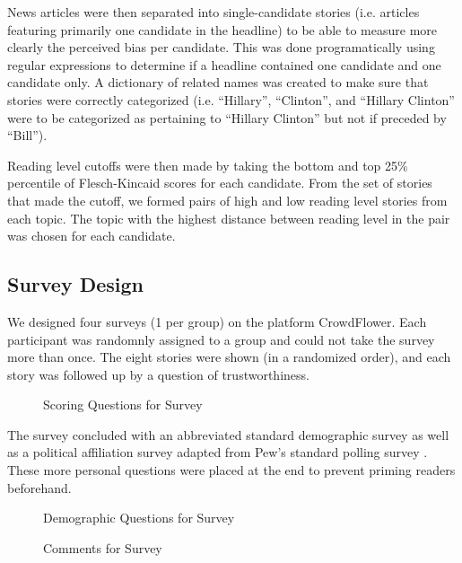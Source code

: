 News articles were then separated into single-candidate stories (i.e. articles featuring primarily one candidate in the headline) to be able to measure more clearly the perceived bias per candidate. This was done programatically using regular expressions to determine if a headline contained one candidate and one candidate only. A dictionary of related names was created to make sure that stories were correctly categorized (i.e. ``Hillary'', ``Clinton'', and ``Hillary Clinton'' were to be categorized as pertaining to ``Hillary Clinton'' but not if preceded by ``Bill'').

Reading level cutoffs were then made by taking the bottom and top 25\% percentile of Flesch-Kincaid scores for each candidate. From the set of stories that made the cutoff, we formed pairs of high and low reading level stories from each topic. The topic with the highest distance between reading level in the pair was chosen for each candidate.

 
\subsection{Survey Design}
We designed four surveys (1 per group) on the platform CrowdFlower. Each participant was randomnly assigned to a group and could not take the survey more than once. The eight stories were shown (in a randomized order), and each story was followed up by a question of trustworthiness.

\begin{figure}[H] 
\centering
  \caption{Scoring Questions for Survey}
\end{figure}

The survey concluded with an abbreviated standard demographic survey as well as a political affiliation survey adapted from Pew's standard polling survey \cite{Pew-demographics}. These more personal questions were placed at the end to prevent priming readers beforehand.


\begin{figure}[h!] 
\centering
  \caption{Demographic Questions for Survey}
\end{figure}


\begin{figure}[H] 
\centering
  \caption{Comments for Survey}
\end{figure}

